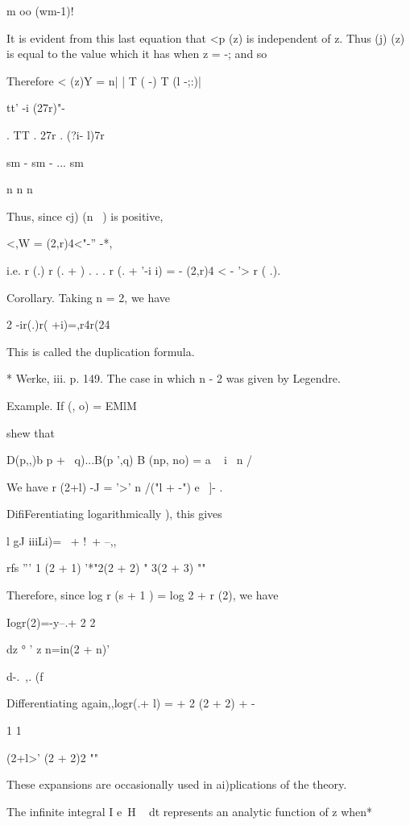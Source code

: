 m oo (wm-1)!

It is evident from this last equation that <p (z) is independent of z.
Thus (j) (z) is equal to the value which it has when z = -; and so

Therefore < (z)Y = n| | T ( -) T (l -;:)|

tt' -i (27r)"-

. TT . 27r . (?i- l)7r

sm - sm - ... sm

n n n

Thus, since cj) (n~ ) is positive,

<,W = (2,r)4<"-'' -*,

i.e. r (.) r (. + ) . . . r (. + '-i i) = - (2,r)4 < - '> r ( .).

Corollary. Taking n = 2, we have

2 -ir(.)r( +i)=,r4r(24

This is called the duplication formula.

* Werke, iii. p. 149. The case in which n - 2 was given by Legendre.

%
%

Example. If (, o) = EMlM

shew that

D(p,,)b p + \ q)...B(p ',q) B (np, no) = a ~ i \ n /


We have r (2+l) -J = '>' n /("l + -") e~ ]- .

DifiFerentiating logarithmically ), this gives

l gJ iiiLi)= \ + !\ + --,,

rfs ''' 1 (2 + 1) '*"2(2 + 2) " 3(2 + 3) ""

Therefore, since log r (s + 1 ) = log 2 + r (2), we have

Iogr(2)=-y--.+ 2 2

dz ° ' z n=in(2 + n)'

d-. \,,. (f

Differentiating again,,logr(.+ l) = + 2 (2 + 2) + -

1 1

 (2+l>' (2 + 2)2 ""

These expansions are occasionally used in ai)plications of the theory.

The infinite integral I e~H ~ dt represents an analytic function of z
when*

